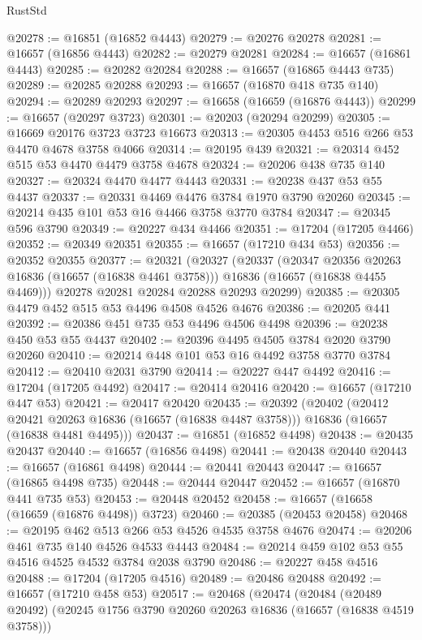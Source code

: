 \begin{lexlean}{RustStd}
\begin{coremodule}
@20278 := @16851 (@16852 @4443)
@20279 := @20276 @20278
@20281 := @16657 (@16856 @4443)
@20282 := @20279 @20281
@20284 := @16657 (@16861 @4443)
@20285 := @20282 @20284
@20288 := @16657 (@16865 @4443 @735)
@20289 := @20285 @20288
@20293 := @16657 (@16870 @418 @735 @140)
@20294 := @20289 @20293
@20297 := @16658 (@16659 (@16876 @4443))
@20299 := @16657 (@20297 @3723)
@20301 := @20203 (@20294 @20299)
@20305 := @16669 @20176 @3723 @3723 @16673
@20313 := @20305 @4453 @516 @266 @53 @4470 @4678 @3758 @4066
@20314 := @20195 @439
@20321 := @20314 @452 @515 @53 @4470 @4479 @3758 @4678
@20324 := @20206 @438 @735 @140
@20327 := @20324 @4470 @4477 @4443
@20331 := @20238 @437 @53 @55 @4437
@20337 := @20331 @4469 @4476 @3784 @1970 @3790 @20260
@20345 := @20214 @435 @101 @53 @16 @4466 @3758 @3770 @3784
@20347 := @20345 @596 @3790
@20349 := @20227 @434 @4466
@20351 := @17204 (@17205 @4466)
@20352 := @20349 @20351
@20355 := @16657 (@17210 @434 @53)
@20356 := @20352 @20355
@20377 := @20321
    (@20327
      (@20337
        (@20347 @20356 @20263 @16836 (@16657 (@16838 @4461 @3758)))
        @16836
        (@16657 (@16838 @4455 @4469)))
      @20278
      @20281
      @20284
      @20288
      @20293
      @20299)
@20385 := @20305 @4479 @452 @515 @53 @4496 @4508 @4526 @4676
@20386 := @20205 @441
@20392 := @20386 @451 @735 @53 @4496 @4506 @4498
@20396 := @20238 @450 @53 @55 @4437
@20402 := @20396 @4495 @4505 @3784 @2020 @3790 @20260
@20410 := @20214 @448 @101 @53 @16 @4492 @3758 @3770 @3784
@20412 := @20410 @2031 @3790
@20414 := @20227 @447 @4492
@20416 := @17204 (@17205 @4492)
@20417 := @20414 @20416
@20420 := @16657 (@17210 @447 @53)
@20421 := @20417 @20420
@20435 := @20392
    (@20402
      (@20412 @20421 @20263 @16836 (@16657 (@16838 @4487 @3758)))
      @16836
      (@16657 (@16838 @4481 @4495)))
@20437 := @16851 (@16852 @4498)
@20438 := @20435 @20437
@20440 := @16657 (@16856 @4498)
@20441 := @20438 @20440
@20443 := @16657 (@16861 @4498)
@20444 := @20441 @20443
@20447 := @16657 (@16865 @4498 @735)
@20448 := @20444 @20447
@20452 := @16657 (@16870 @441 @735 @53)
@20453 := @20448 @20452
@20458 := @16657 (@16658 (@16659 (@16876 @4498)) @3723)
@20460 := @20385 (@20453 @20458)
@20468 := @20195 @462 @513 @266 @53 @4526 @4535 @3758 @4676
@20474 := @20206 @461 @735 @140 @4526 @4533 @4443
@20484 := @20214 @459 @102 @53 @55 @4516 @4525 @4532 @3784 @2038 @3790
@20486 := @20227 @458 @4516
@20488 := @17204 (@17205 @4516)
@20489 := @20486 @20488
@20492 := @16657 (@17210 @458 @53)
@20517 := @20468
    (@20474
      (@20484
        (@20489 @20492)
        (@20245 @1756 @3790 @20260 @20263 @16836 (@16657 (@16838 @4519 @3758)))

\end{coremodule}
\end{lexlean}
